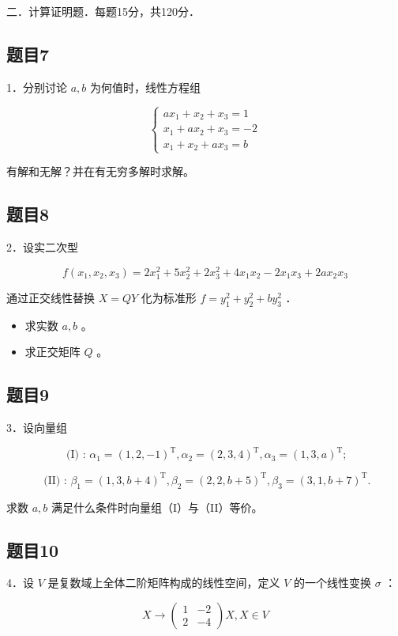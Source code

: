 \documentclass{article}
\begin{document}
二．计算证明题．每题15分，共120分．\\

\subsection{题目7}
1．分别讨论 \(a, b\) 为何值时，线性方程组

\[
\left\{\begin{array}{l}
a x_{1}+x_{2}+x_{3}=1 \\
x_{1}+a x_{2}+x_{3}=-2 \\
x_{1}+x_{2}+a x_{3}=b
\end{array}\right.
\]

有解和无解？并在有无穷多解时求解。

\subsection{题目8}
2．设实二次型

\[
f\left(x_{1}, x_{2}, x_{3}\right)=2 x_{1}^{2}+5 x_{2}^{2}+2 x_{3}^{2}+4 x_{1} x_{2}-2 x_{1} x_{3}+2 a x_{2} x_{3}
\]

通过正交线性替换 \(X=Q Y\) 化为标准形 \(f=y_{1}^{2}+y_{2}^{2}+b y_{3}^{2}\) ．

\begin{itemize}
  \item[（1）] 求实数 \(a, b\) 。
  \item[（2）] 求正交矩阵 \(Q\) 。
\end{itemize}

\subsection{题目9}
3．设向量组

\[
\text { (I) : } \alpha_{1}=(1,2,-1)^{\mathrm{T}}, \alpha_{2}=(2,3,4)^{\mathrm{T}}, \alpha_{3}=(1,3, a)^{\mathrm{T}} ;
\]

\[
\text { (II) : } \beta_{1}=(1,3, b+4)^{\mathrm{T}}, \beta_{2}=(2,2, b+5)^{\mathrm{T}}, \beta_{3}=(3,1, b+7)^{\mathrm{T}} .
\]

求数 \(a, b\) 满足什么条件时向量组（I）与（II）等价。

\subsection{题目10}
4．设 \(V\) 是复数域上全体二阶矩阵构成的线性空间，定义 \(V\) 的一个线性变换 \(\sigma\) ：

\[
X \rightarrow\left(\begin{array}{ll}
1 & -2 \\
2 & -4
\end{array}\right) X, X \in V
\]
\end{document}
